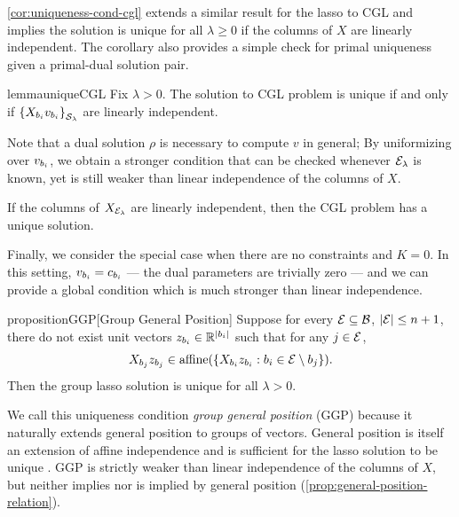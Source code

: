 \cref{cor:uniqueness-cond-cgl} extends a similar result for the lasso
to CGL \citep[Eq. 9]{tibshirani2013unique} and
implies the solution is unique for all \( \lambda \geq 0 \) if
the columns of \( X \) are linearly independent.
The corollary also provides a simple check
for primal uniqueness given a primal-dual solution pair.

\begin{restatable}{lemma}{uniqueCGL}\label{lemma:unique-cgl}
    Fix \( \lambda > 0 \).
    The solution to CGL problem is unique
    if and only if \( \left\{X_{b_i} v_{b_i}\right\}_{\mathcal{S}_\lambda} \)
    are linearly independent.
\end{restatable}

Note that a dual solution \( \rho \) is necessary to compute \( v \) in general;
By uniformizing over \( v_{b_i} \), we obtain a stronger condition that can be checked
whenever \( {\mathcal{E}_{\lambda}} \) is known, yet is still
weaker than linear independence of the columns
of \( X \).

\begin{corollary}
    If the columns of \( X_{\mathcal{E}_{\lambda}} \) are linearly independent,
    then the CGL problem has a unique solution.
\end{corollary}

Finally, we consider the special case when there are no constraints and
\( K = 0 \).
In this setting, \( v_{b_i} = c_{b_i} \) --- the dual parameters are trivially zero
--- and we can provide a global condition which is much stronger than linear
independence.

\begin{restatable}{proposition}{GGP}[Group General Position]\label{prop:unique-sol}
    Suppose for every \( \mathcal{E} \subseteq \mathcal{B} \), \( \left\vert \mathcal{E}\right\vert \leq n +1 \),
    there do not exist unit vectors \( z_{b_i} \in \mathbb{R}^{\left\vert {b_i}\right\vert} \)
    such that for any \( j \in \mathcal{E} \),
    \[
        X_{b_j} z_{b_j} \in
        \text{affine}(\left\{X_{b_i} z_{b_i} : {b_i} \in \mathcal{E} \setminus b_j\right\}).
    \]
    Then the group lasso solution is unique for all \( \lambda > 0 \).
\end{restatable}
We call this uniqueness condition \emph{group general position}
(GGP) because it naturally extends general position to groups of vectors.
General position is itself an extension of affine independence and is
sufficient for the lasso solution to be unique \citep{tibshirani2013unique}.
GGP is strictly weaker than linear independence of the columns of \( X \),
but neither implies nor is implied by general position (\cref{prop:general-position-relation}).

